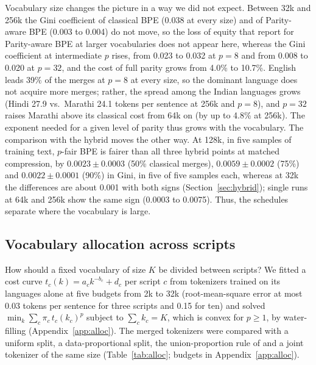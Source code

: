 Vocabulary size changes the picture in a way we did not expect. Between 32k and 256k the
Gini coefficient of classical BPE (0.038 at every size) and of Parity-aware BPE (0.003 to
0.004) do not move, so the loss of equity that \citet{lee2026} report for Parity-aware BPE
at larger vocabularies does not appear here, whereas the Gini coefficient at intermediate
$p$ rises, from 0.023 to 0.032 at $p=8$ and from 0.008 to 0.020 at $p=32$, and the cost of
full parity grows from 4.0\% to 10.7\%. English leads 39\% of the merges at $p=8$ at every size, so the dominant language does not
acquire more merges; rather, the spread among the Indian languages grows (Hindi 27.9 vs.\
Marathi 24.1 tokens per sentence at 256k and $p=8$), and $p=32$ raises Marathi above its
classical cost from 64k on (by up to 4.8\% at 256k). The exponent needed for a given level
of parity thus grows with the vocabulary. The comparison with the hybrid moves the other way. At 128k, in five samples of training
text, $p$-fair BPE is fairer than all three hybrid points at matched compression, by
$0.0023\pm0.0003$ (50\% classical merges), $0.0059\pm0.0002$ (75\%) and $0.0022\pm0.0001$
(90\%) in Gini, in five of five samples each, whereas at 32k the differences are about 0.001
with both signs (Section~\ref{sec:hybrid}); single runs at 64k and 256k show the same sign
(0.0003 to 0.0075). Thus, the schedules separate where the vocabulary is large.


\subsection{Vocabulary allocation across scripts}
\label{sec:alloc}

How should a fixed vocabulary of size $K$ be divided between scripts? We fitted a cost curve
$t_c(k)=a_c k^{-b_c}+d_c$ per script $c$ from tokenizers trained on its languages alone at
five budgets from 2k to 32k (root-mean-square error at most 0.03 tokens per sentence for
three scripts and 0.15 for ten) and solved $\min_k \sum_c \pi_c\, t_c(k_c)^p$ subject to
$\sum_c k_c=K$, which is convex for $p\ge1$, by water-filling (Appendix~\ref{app:alloc}).
The merged tokenizers were compared with a uniform split, a data-proportional split, the
union-proportion rule of \citet{brahma2026} and a joint tokenizer of the same size
(Table~\ref{tab:alloc}; budgets in Appendix~\ref{app:alloc}).

